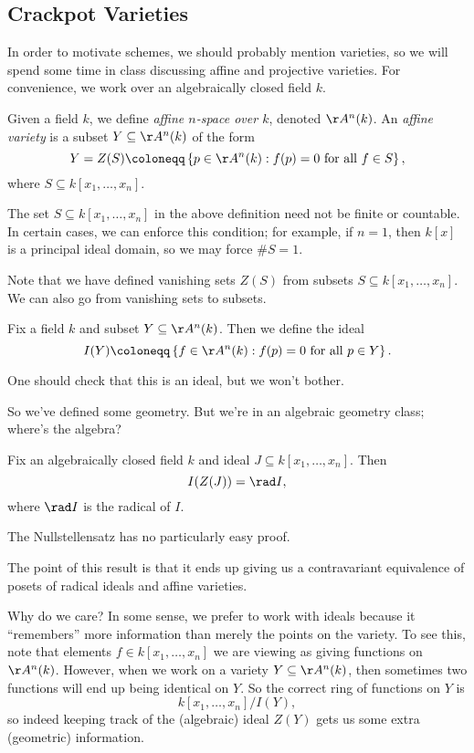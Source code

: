 \documentclass[../notes.tex]{subfiles}
\begin{document}
\subsection{Crackpot Varieties}
In order to motivate schemes, we should probably mention varieties, so we will spend some time in class discussing affine and projective varieties. For convenience, we work over an algebraically closed field $k$.
\begin{definition}
	Given a field $k$, we define \textit{affine $n$-space over $k$}, denoted $\AA^n(k)$. An \textit{affine variety} is a subset $Y\subseteq\AA^n(k)$ of the form
	\[Y=Z(S)\coloneqq\left\{p\in\AA^n(k):f(p)=0\text{ for all }f\in S\right\},\]
	where $S\subseteq k[x_1,\ldots,x_n]$.
\end{definition}
\begin{remark}
	The set $S\subseteq k[x_1,\ldots,x_n]$ in the above definition need not be finite or countable. In certain cases, we can enforce this condition; for example, if $n=1$, then $k[x]$ is a principal ideal domain, so we may force $\#S=1$.
\end{remark}
Note that we have defined vanishing sets $Z(S)$ from subsets $S\subseteq k[x_1,\ldots,x_n]$. We can also go from vanishing sets to subsets.
\begin{definition}
	Fix a field $k$ and subset $Y\subseteq\AA^n(k)$. Then we define the ideal
	\[I(Y)\coloneqq\left\{f\in\AA^n(k):f(p)=0\text{ for all }p\in Y\right\}.\]
\end{definition}
\begin{remark}
	One should check that this is an ideal, but we won't bother.
\end{remark}
So we've defined some geometry. But we're in an algebraic geometry class; where's the algebra?
\begin{theorem}
	Fix an algebraically closed field $k$ and ideal $J\subseteq k[x_1,\ldots,x_n]$.  Then
	\[I(Z(J))=\rad I,\]
	where $\rad I$ is the radical of $I$.
\end{theorem}
\begin{remark}
	The Nullstellensatz has no particularly easy proof.
\end{remark}
The point of this result is that it ends up giving us a contravariant equivalence of posets of radical ideals and affine varieties.

Why do we care? In some sense, we prefer to work with ideals because it ``remembers'' more information than merely the points on the variety. To see this, note that elements $f\in k[x_1,\ldots,x_n]$ we are viewing as giving functions on $\AA^n(k)$. However, when we work on a variety $Y\subseteq\AA^n(k)$, then sometimes two functions will end up being identical on $Y$. So the correct ring of functions on $Y$ is
\[k[x_1,\ldots,x_n]/I(Y),\]
so indeed keeping track of the (algebraic) ideal $Z(Y)$ gets us some extra (geometric) information.
\end{document}

